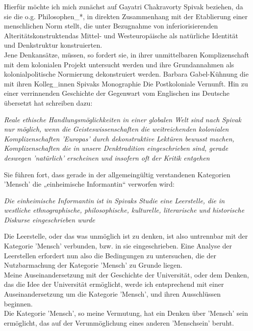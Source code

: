 \noindent Hierfür möchte ich mich zunächst auf Gayatri Chakravorty Spivak beziehen, da
sie die o.g. Philosophen\_*, in direkten Zusammenhang mit der Etablierung einer
\glqq menschlichen Norm\grqq \footnotemark {}
stellt, die unter Bezugnahme von \glqq inferiorisierenden Alteritätskonstrukten\grqq das Mittel- und Westeuropäische als natürliche Identität und Denkstruktur
konstruierten.\\
Jene Denkansätze, müssen, so fordert sie, in ihrer unmittelbaren
Komplizenschaft mit dem kolonialen Projekt untersucht werden und ihre
Grundannahmen als kolonialpolitische Normierung dekonstruiert werden.\footnotemark {}
Barbara Gabel-Kühnung die mit ihren Kolleg\_innen Spivaks Monographie \glqq Die Postkoloniale Vernunft. Hin zu einer verrinnenden
Geschichte der Gegenwart\grqq \footnotemark {} vom Englischen ins Deutsche übersetzt hat schreiben dazu: 
\begin{myenv} 
  \textit{ \glqq Reale ethische
  Handlungsmöglichkeiten in einer globalen Welt sind nach Spivak nur möglich,
wenn die Geisteswissenschaften die weitreichenden kolonialen Komplizenschaften
'Europas' durch dekonstruktive Lektüren bewusst machen, Komplizenschaften die
in unsere Denktradition eingeschrieben sind, gerade deswegen 'natürlich'
erscheinen und insofern oft der Kritik entgehen\grqq\footnotemark
{}} 
\end{myenv} 
Sie führen fort, dass gerade in der allgemeingültig verstandenen Kategorien 'Mensch' die
 „einheimische Informantin“ verworfen wird:
\begin{myenv} \textit{
    \glqq Die einheimische Informantin ist in Spivaks Studie eine Leerstelle,
die in westliche ethnographische, philosophische, kulturelle, literarische und
historische Diskurse eingeschrieben wurde\grqq \footnotemark {}} 
\end{myenv}
Die Leerstelle, oder das was unmöglich ist zu denken, ist also untrennbar mit
der Kategorie 'Mensch' verbunden, bzw. in sie eingeschrieben. Eine Analyse der
Leerstellen erfordert nun also die Bedingungen zu untersuchen, die der
Nutzbarmachung der Kategorie 'Mensch' zu Grunde liegen. \\
Meine Auseinandersetzung mit
der Geschichte der Universität, oder dem Denken, das die Idee der Universität
ermöglicht, werde ich entsprechend mit einer Auseinandersetzung um die
Kategorie 'Mensch', und ihren Ausschlüssen beginnen.\\
Die Kategorie 'Mensch', so
meine Vermutung, hat ein Denken über 'Mensch' sein ermöglicht, das auf der
Verunmöglichung eines anderen 'Menschsein' beruht.\\

